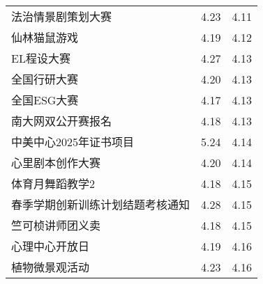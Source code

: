 \documentclass[letterpaper, 12pt]{article}
\begin{document}
\begin{multicols}{2}
{\begin{longtable}{|>{\centering\arraybackslash}m{}|m{}|m{}|}
    法治情景剧策划大赛 & 4.23 & 4.11\\
    仙林猫鼠游戏 & 4.19 & 4.12\\
    EL程设大赛 & 4.27 & 4.13\\
    全国行研大赛 & 4.20 & 4.13\\
    全国ESG大赛 & 4.17 & 4.13\\
    南大网双公开赛报名 & 4.18 & 4.13\\
    中美中心2025年证书项目 & 5.24 & 4.14\\
    心里剧本创作大赛 & 4.20 & 4.14\\
    体育月舞蹈教学2 & 4.18 & 4.15\\
    春季学期创新训练计划结题考核通知 & 4.28 & 4.15\\
    竺可桢讲师团义卖 & 4.18 & 4.15\\
    心理中心开放日 & 4.19 & 4.16\\
    植物微景观活动 & 4.23 & 4.16\\
    \hline
\end{longtable}
\unskip
\unpenalty
\unpenalty}\unvbox\colbbox
\end{multicols}
\end{document}
